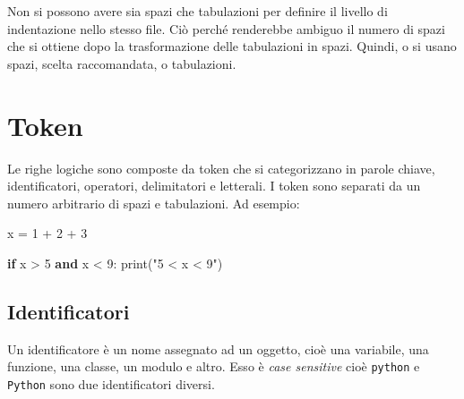 \documentclass[
  letterpaper,
]{scrbook}
\newenvironment{Shaded}{\begin{snugshade}}{\end{snugshade}}
\newcommand{\BuiltInTok}[1]{\textcolor[rgb]{0.00,0.23,0.31}{#1}}
\newcommand{\ControlFlowTok}[1]{\textcolor[rgb]{0.00,0.23,0.31}{\textbf{#1}}}
\newcommand{\DecValTok}[1]{\textcolor[rgb]{0.68,0.00,0.00}{#1}}
\newcommand{\KeywordTok}[1]{\textcolor[rgb]{0.00,0.23,0.31}{\textbf{#1}}}
\newcommand{\NormalTok}[1]{\textcolor[rgb]{0.00,0.23,0.31}{#1}}
\newcommand{\OperatorTok}[1]{\textcolor[rgb]{0.37,0.37,0.37}{#1}}
\newcommand{\StringTok}[1]{\textcolor[rgb]{0.13,0.47,0.30}{#1}}
\begin{document}
\begin{tcolorbox}[enhanced jigsaw, leftrule=.75mm, arc=.35mm, opacityback=0, rightrule=.15mm, titlerule=0mm, colbacktitle=quarto-callout-warning-color!10!white, colback=white, colframe=quarto-callout-warning-color-frame, bottomrule=.15mm, toprule=.15mm, bottomtitle=1mm, toptitle=1mm, title=\textcolor{quarto-callout-warning-color}{\faExclamationTriangle}\hspace{0.5em}{Attenzione}, breakable, coltitle=black, opacitybacktitle=0.6, left=2mm]

Non si possono avere sia spazi che tabulazioni per definire il livello
di indentazione nello stesso file. Ciò perché renderebbe ambiguo il
numero di spazi che si ottiene dopo la trasformazione delle tabulazioni
in spazi. Quindi, o si usano spazi, scelta raccomandata, o tabulazioni.

\end{tcolorbox}

\section{Token}\label{token-1}

Le righe logiche sono composte da token che si categorizzano in parole
chiave, identificatori, operatori, delimitatori e letterali. I token
sono separati da un numero arbitrario di spazi e tabulazioni. Ad
esempio:

\begin{Shaded}
\begin{Highlighting}[]
\NormalTok{x }\OperatorTok{=} \DecValTok{1}  \OperatorTok{+}  \DecValTok{2}  \OperatorTok{+}  \DecValTok{3}

\ControlFlowTok{if}\NormalTok{    x }\OperatorTok{\textgreater{}} \DecValTok{5}    \KeywordTok{and}\NormalTok{    x }\OperatorTok{\textless{}} \DecValTok{9}\NormalTok{: }
  \BuiltInTok{print}\NormalTok{(}\StringTok{"5 \textless{} x \textless{} 9"}\NormalTok{) }
\end{Highlighting}
\end{Shaded}

\subsection{Identificatori}\label{identificatori}

Un identificatore è un nome assegnato ad un oggetto, cioè una variabile,
una funzione, una classe, un modulo e altro. Esso è \emph{case
sensitive} cioè \texttt{python} e \texttt{Python} sono due
identificatori diversi.
\end{document}
